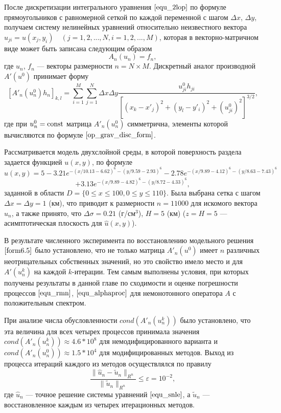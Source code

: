 После дискретизации интегрального уравнения $\eqref{equ_2lop}$ по формуле прямоугольников с равномерной сеткой по каждой переменной с шагом $\Delta x$, $\Delta y$, получаем систему нелинейных уравнений относительно неизвестного вектора $u_{ji}=u(x_j,y_i)\quad (j=1,2,...,N, i=1,2,...,M)$, которая в векторно-матричном виде может быть записана следующим образом
\begin{equation}\label{equ_snle}
	A_n(u_n)=f_n,
\end{equation}
где $u_n$, $f_n$ --- векторы размерности $n=N\times M$. Дискретный аналог производной $A'(u^0)$ принимает форму
\begin{equation}\label{op_grav_disc_form}
	[A'_n(u_n^0)h_n]_{k,l}=\sum\limits_{i=1}^{M}\sum\limits_{j=1}^{N}
	\Delta x\Delta y\frac{u^0_{ji}h_{ji}}{[(x_k-x'_j)^2+(y_l-y'_i)^2+(u^0_{ji})^2]^{3/2}},
\end{equation}
где при $u_{n}^{0}=\textnormal{const}$ матрица $A'_n(u_n^0)$ симметрична, элементы которой вычисляются по формуле $\eqref{op_grav_disc_form}$.

Рассматривается модель двухслойной среды, в которой поверхность раздела задается функцией $u(x,y)$, по формуле %
$$
\hat{u}(x,y)=5-3.21e^{-(x/10.13-6.62)^6-(y/9.59-2.93)^6}-
2.78e^{-(x/9.89-4.12)^6-(y/8.63-7.43)^6}$$
\begin{equation}\label{form6.5}
+3.13e^{-(x/9.89-4.82)^6-(y/8.72-4.33)^6},
\end{equation}
заданной в области $D=\{0\le x\le 100, 0\le y \le 110\}$. Была выбрана сетка с шагом $\Delta x=\Delta y=1$ (км), что приводит к размерности $n=11000$ для искомого вектора $u_n$, а также принято, что $\Delta\sigma=0.21$ (г/см$^3$), $H=5$ (км) ($z=H=5$ --- асимптотическая плоскость для $\hat{u}(x,y)$).

В результате численного эксперимента по восстановлению модельного решения $\eqref{form6.5}$ было установлено, что не только матрица $A'_n(u^0)$ имеет $n$ различных неотрицательных собственных значений, но это свойство имело место и для $A'(u_n^k)$ на каждой $k$-итерации. Тем самым выполнены условия, при которых получены результаты в данной главе по сходимости и оценке погрешности процессов $\eqref{equ_rmn}$, $\eqref{equ_alphaproc}$ для немонотонного оператора $A$ с положительным спектром. 

При анализе числа обусловленности $cond(A'_n(u_n^k))$ было установлено, что эта величина для всех четырех процессов принимала значения $cond(A'_n(u_n^k))\approx 4.6 * 10^{8}$ для немодифицированного варианта и $cond(A'_n(u_n^0))\approx 1.5 * 10^{4}$ для модифицированных методов. Выход из процесса итераций каждого из методов осуществлялся по правилу
\begin{equation}\label{cond6.6}
\frac{\|\hat{u}_n-\tilde{u}_n\|_{R^n}}{\|\tilde{u}_n\|_{R^n}}\le\varepsilon=10^{-2},
\end{equation}
где $\hat{u}_n$ --- точное решение системы уравнений $\eqref{equ_snle}$, а $\tilde{u}_n$ --- восстановленное каждым из четырех итерационных методов.

